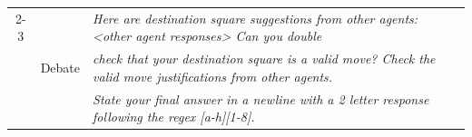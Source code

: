 \begin{table}[t]
{\begin{tabular}{c|c|l}
     \cmidrule{2-3}
       & \multirow{3}{*}{Debate} & \emph{Here are destination square suggestions from other agents: <other agent responses>  Can you double}\\
       & & \emph{check that your destination square is a valid move? Check the valid move justifications from other agents.}\\
       & & \emph{State your final answer in a newline with a 2 letter response following the regex [a-h][1-8].} \\
    \bottomrule
\end{tabular}
}
\label{tbl:prompt_appendix}
\vspace{-10pt}
\end{table}
